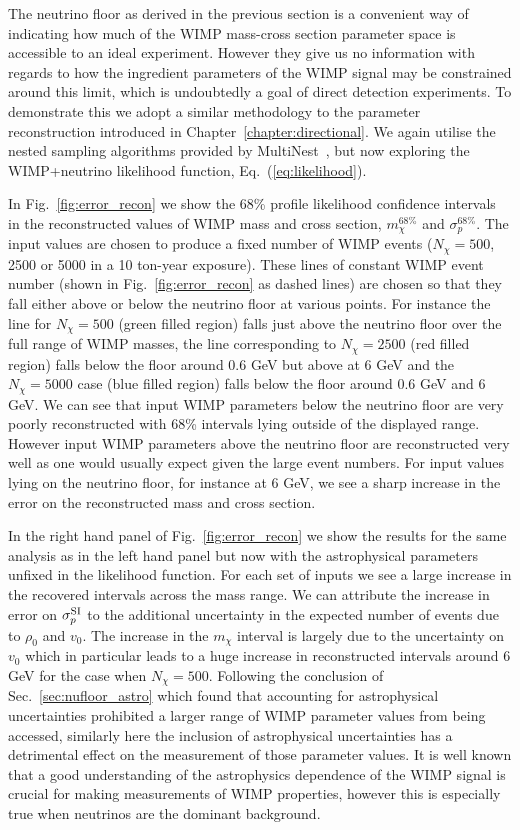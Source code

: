 The neutrino floor as derived in the previous section is a convenient way of indicating how much of the WIMP mass-cross section parameter space is accessible to an ideal experiment. However they give us no information with regards to how the ingredient parameters of the WIMP signal may be constrained around this limit, which is undoubtedly a goal of direct detection experiments. To demonstrate this we adopt a similar methodology to the parameter reconstruction introduced in Chapter~\ref{chapter:directional}. We again utilise the nested sampling algorithms provided by {\sc MultiNest}~\cite{Feroz:2007kg,Feroz:2008xx,Feroz:2013hea}, but now exploring the WIMP+neutrino likelihood function, Eq.~(\ref{eq:likelihood}). 

In Fig.~\ref{fig:error_recon} we show the 68\% profile likelihood confidence intervals in the reconstructed values of WIMP mass and cross section, $m^{68\%}_\chi$ and $\sigma^{68\%}_p$. The input values are chosen to produce a fixed number of WIMP events ($N_\chi = 500$, 2500 or 5000 in a 10 ton-year exposure). These lines of constant WIMP event number (shown in Fig.~\ref{fig:error_recon} as dashed lines) are chosen so that they fall either above or below the neutrino floor at various points. For instance the line for $N_\chi= 500$ (green filled region) falls just above the neutrino floor over the full range of WIMP masses, the line corresponding to $N_\chi = 2500$ (red filled region) falls below the floor around 0.6 GeV but above at 6 GeV and the $N_\chi = 5000$ case (blue filled region) falls below the floor around 0.6 GeV and 6 GeV. We can see that input WIMP parameters below the neutrino floor are very poorly reconstructed with 68\% intervals lying outside of the displayed range. However input WIMP parameters above the neutrino floor are reconstructed very well as one would usually expect given the large event numbers. For input values lying on the neutrino floor, for instance at 6 GeV, we see a sharp increase in the error on the reconstructed mass and cross section. 

In the right hand panel of Fig.~\ref{fig:error_recon} we show the results for the same analysis as in the left hand panel but now with the astrophysical parameters unfixed in the likelihood function. For each set of inputs we see a large increase in the recovered intervals across the mass range. We can attribute the increase in error on $\sigma^{\rm SI}_p$ to the additional uncertainty in the expected number of events due to $\rho_0$ and $v_0$. The increase in the $m_\chi$ interval is largely due to the uncertainty on $v_0$ which in particular leads to a huge increase in reconstructed intervals around 6 GeV for the case when $N_\chi = 500$. Following the conclusion of Sec.~\ref{sec:nufloor_astro} which found that accounting for astrophysical uncertainties prohibited a larger range of WIMP parameter values from being accessed, similarly here the inclusion of astrophysical uncertainties has a detrimental effect on the measurement of those parameter values. It is well known that a good understanding of the astrophysics dependence of the WIMP signal is crucial for making measurements of WIMP properties, however this is especially true when neutrinos are the dominant background.

